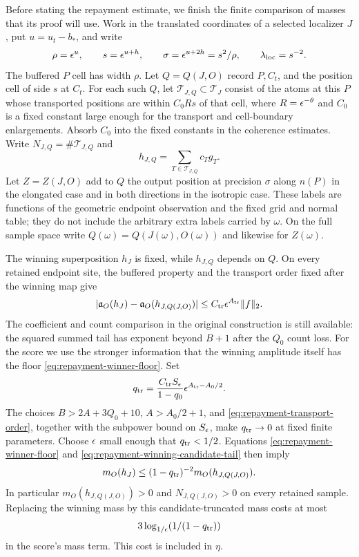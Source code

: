 Before stating the repayment estimate, we finish the finite comparison
of masses that its proof will use.  Work in the translated coordinates
of a selected localizer \(J\), put \(u=u_t-b_*\), and write
\[
 \rho=\epsilon^u,\qquad s=\epsilon^{u+h},\qquad
 \sigma=\epsilon^{u+2h}=s^2/\rho,\qquad \lambda_{\rm loc}=s^{-2}.
\]
The buffered \(P\) cell has width \(\rho\).  Let \(Q=Q(J,O)\) record
\(P,C_t\), and the position cell of side \(s\) at \(C_t\).
For each such \(Q\), let \(\mathcal T_{J,Q}\subset\mathcal T_J\)
consist of the atoms at this \(P\) whose transported positions are
within \(C_0 R s\) of that cell, where \(R=\epsilon^{-\theta}\)
and \(C_0\) is a fixed constant large enough for the transport and
cell-boundary enlargements.  Absorb \(C_0\) into the fixed constants
in the coherence estimates.
Write \(N_{J,Q}=\#\mathcal T_{J,Q}\) and
\[
 h_{J,Q}=\sum_{T\in\mathcal T_{J,Q}}c_Tg_T.
\]
Let \(Z=Z(J,O)\) add to \(Q\) the output position at precision
\(\sigma\) along \(n(P)\) in the elongated case and in both
directions in the isotropic case.  These labels are functions of the
geometric endpoint observation and the fixed grid and normal table;
they do not include the arbitrary extra labels carried by \(\omega\).
On the full sample space write \(Q(\omega)=Q(J(\omega),O(\omega))\)
and likewise for \(Z(\omega)\).

The winning superposition \(h_J\) is fixed, while \(h_{J,Q}\)
depends on \(Q\).  On every retained endpoint site, the buffered
property and the transport order fixed after the winning map give
\begin{equation}
 |\mathfrak a_O(h_J)-\mathfrak a_O(h_{J,Q(J,O)})|
       \le C_{\rm tr}\epsilon^{A_{\rm tr}}\|f\|_2 .
 \label{eq:repayment-winning-candidate-tail}
\end{equation}
The coefficient and count comparison in the original construction
is still available: the squared summed tail has exponent beyond
\(B+1\) after the \(Q_0\) count loss.  For the score we use the
stronger information that the winning amplitude itself has the
floor \eqref{eq:repayment-winner-floor}.  Set
\[
 q_{\rm tr}=
 \frac{C_{\rm tr}S_\epsilon}{1-q_0}
       \epsilon^{A_{\rm tr}-A_0/2}.
\]
The choices \(B>2A+3Q_0+10\), \(A>A_0/2+1\), and
\eqref{eq:repayment-transport-order}, together with the subpower
bound on \(S_\epsilon\), make \(q_{\rm tr}\to0\) at fixed finite
parameters.  Choose \(\epsilon\) small enough that \(q_{\rm tr}<1/2\).
Equations \eqref{eq:repayment-winner-floor} and
\eqref{eq:repayment-winning-candidate-tail} then imply
\begin{equation}
 m_O(h_J)\le(1-q_{\rm tr})^{-2}m_O(h_{J,Q(J,O)}).
 \label{eq:repayment-winning-candidate}
\end{equation}
In particular \(m_O(h_{J,Q(J,O)})>0\) and \(N_{J,Q(J,O)}>0\) on
every retained sample.  Replacing the winning mass by this
candidate-truncated mass costs at most
\begin{equation}
 3\log_{1/\epsilon}\!\left(1/(1-q_{\rm tr})\right)
 \label{eq:repayment-candidate-score-cost}
\end{equation}
in the score's mass term.  This cost is included in \(\eta\).

